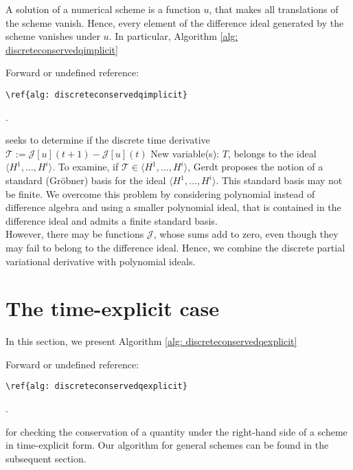 \documentclass[sigconf,twocolumn]{acmart}
\newcommand{\1}{{\chi}}
\numberwithin{equation}{section}
\theoremstyle{thmlemcorr}
\numberwithin{theorem}{section}
\theoremstyle{thmlemcorr*}
\theoremstyle{defi}
\theoremstyle{remexample}
\theoremstyle{ass}
\begin{document}
A solution of a numerical scheme is a function \(u\), that makes all translations of the scheme vanish. Hence, every element of the difference ideal generated by the scheme vanishes under \(u\).
In particular, Algorithm \ref{alg: discreteconservedqimplicit}
 {\color{red} Forward or undefined reference: \begin{verbatim}\ref{alg: discreteconservedqimplicit}\end{verbatim}.}
 seeks to determine if the discrete time derivative \(\mathcal{T}:=\mathcal{J}[u](t+1)-\mathcal{J}[u](t)\)
{\color{blue} New variable(s): \(T\),  }
 belongs to the ideal \(\langle H^1,\ldots,H^i\rangle\). To examine, if \(\mathcal{T}\in\langle H^1,\ldots,H^i\rangle\), Gerdt proposes the notion of a standard (Gr{\"o}bner) basis for the ideal \(\langle H^1,\ldots,H^i\rangle\). This standard basis may not be finite. We overcome this problem by considering polynomial instead of difference algebra and using a smaller polynomial ideal, that is contained in the difference ideal and admits a finite standard basis.\\
However, there may be functions \(\mathcal{J}\), whose sums add to zero, even though they may fail to belong to the difference ideal. Hence, we combine the discrete partial variational derivative with polynomial ideals.
\section{The time-explicit case}
\label{time-exp}
In this section, we present Algorithm \ref{alg: discreteconservedqexplicit}
 {\color{red} Forward or undefined reference: \begin{verbatim}\ref{alg: discreteconservedqexplicit}\end{verbatim}.}
  for checking the conservation of a quantity under the right-hand side of a scheme in time-explicit form. Our algorithm for general schemes can be found in the subsequent section.
\end{document}
